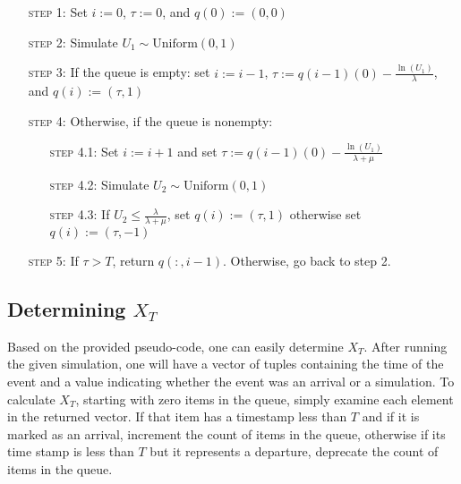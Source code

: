 \documentclass[11pt, oneside]{article}
\begin{document}
\begin{enumerate}[leftmargin=30pt,labelindent=65pt,itemindent=30pt]
\item[\textsc{step 1:}] Set $i:=0$, $\tau:=0$, and $q(0):=(0,0)$
\item[\textsc{step 2:}] Simulate $U_1 \sim \text{Uniform}(0,1)$
\item[\textsc{step 3:}] If the queue is empty: set $i:=i-1$, $\tau:=q(i-1)(0) - \frac{\ln(U_1)}{\lambda}$, and $q(i):=(\tau, 1)$
\item[\textsc{step 4:}] Otherwise, if the queue is nonempty:
\begin{enumerate}[leftmargin=25pt,labelindent=65pt,itemindent=25pt]
\item[\textsc{step 4.1:}] Set $i:=i+1$ and set $\tau:=q(i-1)(0) - \frac{\ln(U_1)}{\lambda + \mu}$
\item[\textsc{step 4.2:}] Simulate $U_2\sim\text{Uniform}(0,1)$
\item[\textsc{step 4.3:}] If $U_2 \leq \frac{\lambda}{\lambda+\mu}$, set $q(i):=(\tau, 1)$ otherwise set $q(i):=(\tau,-1)$
\end{enumerate}
\item[\textsc{step 5:}] If $\tau > T$, return $q(:,i-1)$. Otherwise, go back to step 2.
\end{enumerate}

\subsection{Determining $X_T$}
Based on the provided pseudo-code, one can easily determine $X_T$. After running the given simulation, one will have a vector of tuples containing the time of the event and a value indicating whether the event was an arrival or a simulation. To calculate $X_T$, starting with zero items in the queue, simply examine each element in the returned vector. If that item has a timestamp less than $T$ and if it is marked as an arrival, increment the count of items in the queue, otherwise if its time stamp is less than $T$ but it represents a departure, deprecate the count of items in the queue.
\end{document}
